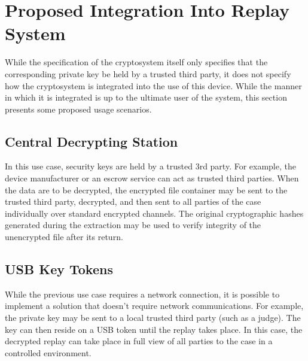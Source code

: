\section{Proposed Integration Into Replay System}

While the specification of the cryptosystem itself only specifies that the corresponding private key be held by a trusted third party, it does
not specify how the cryptosystem is integrated into the use of this device. While the manner in which it is integrated is up to the ultimate
user of the system, this section presents some proposed usage scenarios.

\subsection{Central Decrypting Station}

In this use case, security keys are held by a trusted 3rd party. For example, the device manufacturer or an escrow service can act as
trusted third parties. When the data are to be decrypted, the encrypted file container may be sent to the trusted third party, decrypted,
and then sent to all parties of the case individually over standard encrypted channels. The original cryptographic hashes generated
during the extraction may be used to verify integrity of the unencrypted file after its return.

\subsection{USB Key Tokens}

While the previous use case requires a network connection, it is possible to implement a solution that doesn't require network communications.
For example, the private key may be sent to a local trusted third party (such as a judge). The key can then reside on a USB token until the
replay takes place. In this case, the decrypted replay can take place in full view of all parties to the case in a controlled environment.

